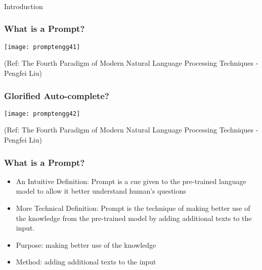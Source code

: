 \begin{frame}[fragile]\frametitle{}
\begin{center}
{\Large Introduction}
\end{center}
\end{frame}








\begin{frame}[fragile]\frametitle{What is a Prompt?}


\begin{center}
\texttt{[image: promptengg41]}

{\tiny (Ref: The Fourth Paradigm of Modern Natural Language Processing Techniques - Pengfei Liu)}

\end{center}		

\end{frame}

\begin{frame}[fragile]\frametitle{Glorified Auto-complete?}


\begin{center}
\texttt{[image: promptengg42]}

{\tiny (Ref: The Fourth Paradigm of Modern Natural Language Processing Techniques - Pengfei Liu)}

\end{center}		

\end{frame}

\begin{frame}[fragile]\frametitle{What is a Prompt?}

\begin{itemize}
\item An Intuitive Definition: Prompt is a cue given to the pre-trained language model to allow it
better understand human’s questions
\item More Technical Definition: Prompt is the technique of making better use of the knowledge from
the pre-trained model by adding additional texts to the input.
\item Purpose: making better use of the knowledge
\item Method: adding additional texts to the input
\end{itemize}
\end{frame}

